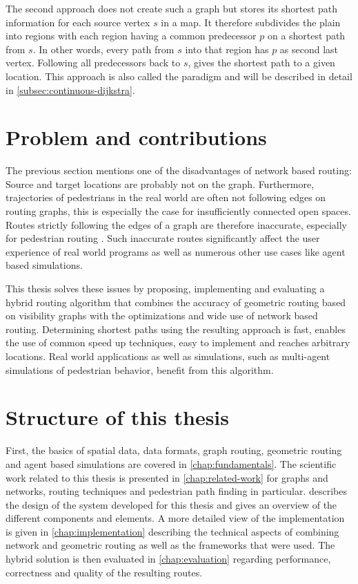 	The second approach does not create such a graph but stores its shortest path information for each source vertex $s$ in a map.
	It therefore subdivides the plain into regions with each region having a common predecessor $p$ on a shortest path from $s$.
	In other words, every path from $s$ into that region has $p$ as second last vertex.
	Following all predecessors back to $s$, gives the shortest path to a given location.
	This approach is also called the  paradigm and will be described in detail in \cref{subsec:continuous-dijkstra}.
	
\section{Problem and contributions}

	The previous section mentions one of the disadvantages of network based routing:
	Source and target locations are probably not on the graph.
	Furthermore, trajectories of pedestrians in the real world are often not following edges on routing graphs, this is especially the case for insufficiently connected open spaces.
	Routes strictly following the edges of a graph are therefore inaccurate, especially for pedestrian routing \cite{graser-osm-open-spaces}.
	Such inaccurate routes significantly affect the user experience of real world programs as well as numerous other use cases like agent based simulations.

	This thesis solves these issues by proposing, implementing and evaluating a hybrid routing algorithm that combines the accuracy of geometric routing based on visibility graphs with the optimizations and wide use of network based routing.
	Determining shortest paths using the resulting approach is fast, enables the use of common speed up techniques, easy to implement and reaches arbitrary locations.
	Real world applications as well as simulations, such as multi-agent simulations of pedestrian behavior, benefit from this algorithm.
	
\section{Structure of this thesis}

	First, the basics of spatial data, data formats, graph routing, geometric routing and agent based simulations are covered in \cref{chap:fundamentals}.
	The scientific work related to this thesis is presented in \cref{chap:related-work} for graphs and networks, routing techniques and pedestrian path finding in particular.
	 describes the design of the system developed for this thesis and gives an overview of the different components and elements.
	A more detailed view of the implementation is given in \cref{chap:implementation} describing the technical aspects of combining network and geometric routing as well as the frameworks that were used.
	The hybrid solution is then evaluated in \cref{chap:evaluation} regarding performance, correctness and quality of the resulting routes.
	
